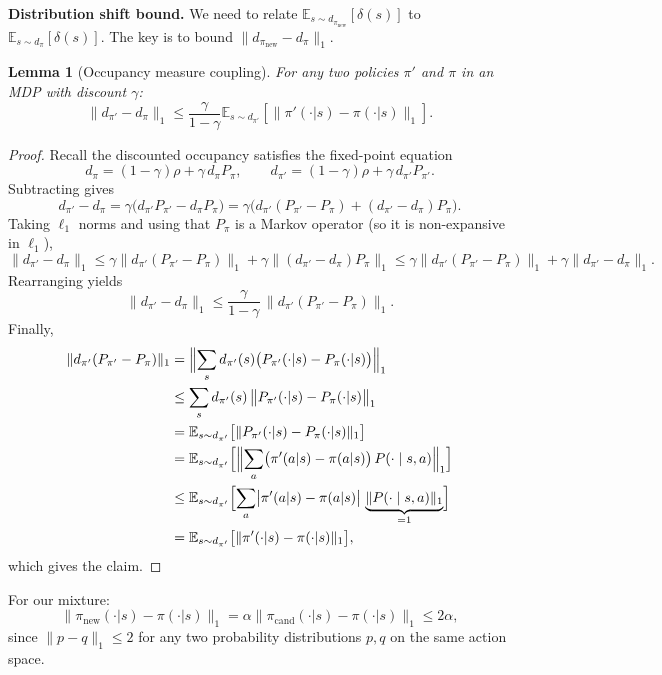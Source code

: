 \documentclass{article}
\theoremstyle{plain}
\newtheorem{lemma}[theorem]{Lemma}
\theoremstyle{definition}
\theoremstyle{remark}
\newcommand{\E}{\mathbb{E}}
\begin{document}
\textbf{Distribution shift bound.}
We need to relate $\E_{s \sim d_{\pi_{\mathrm{new}}}}[\delta(s)]$ to $\E_{s \sim d_\pi}[\delta(s)]$.
The key is to bound $\|d_{\pi_{\mathrm{new}}} - d_\pi\|_1$.

\begin{lemma}[Occupancy measure coupling]
\label{lem:occupancy_coupling}
For any two policies $\pi'$ and $\pi$ in an MDP with discount $\gamma$:
\begin{equation}
\|d_{\pi'} - d_\pi\|_1 \le \frac{\gamma}{1-\gamma} \E_{s \sim d_{\pi'}}[\|\pi'(\cdot|s) - \pi(\cdot|s)\|_1].
\end{equation}
\end{lemma}

\begin{proof}
Recall the discounted occupancy satisfies the fixed-point equation
\[
d_\pi = (1-\gamma)\rho + \gamma\, d_\pi P_\pi,
\qquad
d_{\pi'} = (1-\gamma)\rho + \gamma\, d_{\pi'} P_{\pi'}.
\]
Subtracting gives
\[
d_{\pi'}-d_\pi
=
\gamma\bigl(d_{\pi'}P_{\pi'}-d_\pi P_\pi\bigr)
=
\gamma\bigl(d_{\pi'}(P_{\pi'}-P_\pi) + (d_{\pi'}-d_\pi)P_\pi\bigr).
\]
Taking $\ell_1$ norms and using that $P_\pi$ is a Markov operator (so it is non-expansive in $\ell_1$),
\[
\|d_{\pi'}-d_\pi\|_1
\le
\gamma\|d_{\pi'}(P_{\pi'}-P_\pi)\|_1
+\gamma\|(d_{\pi'}-d_\pi)P_\pi\|_1
\le
\gamma\|d_{\pi'}(P_{\pi'}-P_\pi)\|_1
+\gamma\|d_{\pi'}-d_\pi\|_1.
\]
Rearranging yields
\[
\|d_{\pi'}-d_\pi\|_1
\le
\frac{\gamma}{1-\gamma}\,\|d_{\pi'}(P_{\pi'}-P_\pi)\|_1.
\]
Finally,
\begin{align}
\|d_{\pi'}(P_{\pi'}-P_\pi)\|_1
&=
\Bigl\|
\sum_s d_{\pi'}(s)\bigl(P_{\pi'}(\cdot|s)-P_\pi(\cdot|s)\bigr)
\Bigr\|_1
\notag\\
&\le
\sum_s d_{\pi'}(s)\,\bigl\|P_{\pi'}(\cdot|s)-P_\pi(\cdot|s)\bigr\|_1
\notag\\
&=
\E_{s\sim d_{\pi'}}\bigl[\|P_{\pi'}(\cdot|s)-P_\pi(\cdot|s)\|_1\bigr]
\notag\\
&=
\E_{s\sim d_{\pi'}}\Bigl[\Bigl\|\sum_a \bigl(\pi'(a|s)-\pi(a|s)\bigr)\,P(\cdot\mid s,a)\Bigr\|_1\Bigr]
\notag\\
&\le
\E_{s\sim d_{\pi'}}\Bigl[\sum_a \bigl|\pi'(a|s)-\pi(a|s)\bigr|\,\underbrace{\|P(\cdot\mid s,a)\|_1}_{=1}\Bigr]
\notag\\
&=
\E_{s\sim d_{\pi'}}\bigl[\|\pi'(\cdot|s)-\pi(\cdot|s)\|_1\bigr],
\end{align}
which gives the claim.
\end{proof}

For our mixture:
\begin{equation}
\|\pi_{\mathrm{new}}(\cdot|s) - \pi(\cdot|s)\|_1
=
\alpha \|\pi_{\mathrm{cand}}(\cdot|s) - \pi(\cdot|s)\|_1
\le 2\alpha,
\end{equation}
since $\|p-q\|_1\le 2$ for any two probability distributions $p,q$ on the same action space.
\end{document}
